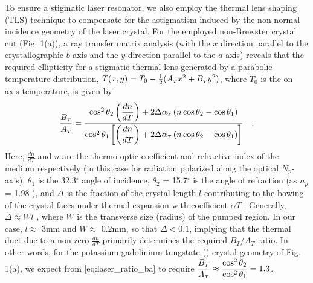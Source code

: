 To ensure a stigmatic laser resonator, we also employ the thermal lens shaping (TLS) technique\cite{Rimington_thermal_lens_2004} to compensate for the astigmatism induced by the non-normal incidence geometry of the laser crystal. 
For the employed non-Brewster crystal cut (Fig. 1(a)), a ray
transfer matrix analysis (with the $x$ direction parallel to the crystallographic $b$-axis and the $y$
direction parallel to the $a$-axis) reveals that the required ellipticity for a stigmatic thermal lens
generated by a parabolic temperature distribution, $T(x, y) = T_0 - \frac{1}{2} ( A_{{\scriptscriptstyle T}} x^2 + B_{{\scriptscriptstyle T}} y^2 )$, where $T_0$
is the on-axis temperature, is given by
\begin{equation} \label{eq:laser_ratio_ba}
  \frac{B_{{\scriptscriptstyle T}}}{A_{{\scriptscriptstyle T}}} = 
  \frac{ \cos^2 \theta_2 \left( \dfrac{dn}{dT} \right) + 2 \Delta \alpha_{{\scriptscriptstyle T}} \left( n \cos\theta_2 - \cos\theta_1 \right) }
       { \cos^2 \theta_1 \left[ \left( \dfrac{dn}{dT} \right) + 2 \Delta \alpha_{{\scriptscriptstyle T}} \left( n \cos\theta_2 - \cos\theta_1 \right) \right] }
  \quad\text{.}
\end{equation}
Here, $\frac{dn}{dT}$ and $n$ are the thermo-optic coefficient and refractive index of the medium respectively (in this case for radiation polarized along the optical $N_p$-axis), $\theta_1$ is the 32.3$^\circ$ angle of incidence, $\theta_2$ = 15.7$^\circ$ is the angle of refraction (as $n_p$ = 1.98 \cite{Biswal_thermo_optical_05,pujol_crystalline_1999}), and $\Delta$ is the fraction of the crystal length $l$ contributing to the bowing of the crystal faces under thermal
expansion with coefficient $\alpha T$ \cite{Rimington_thermal_lens_2004}.
Generally, $\Delta \approx W l$ , where $W$ is the transverse size (radius) of the pumped region\cite{Koechner_thermal_1970}.
In our case, $l \approx$ 3mm and $W \approx$ 0.2mm, so that $\Delta < 0.1$, implying that the thermal duct due to a non-zero $\frac{dn}{dT}$ primarily determines the required $B_T$/$A_T$ ratio.
In other words, for the potassium gadolinium tungstate () crystal geometry of Fig. 1(a), we expect from \ref{eq:laser_ratio_ba} to require $\dfrac{B_{{\scriptscriptstyle T}}}{A_{{\scriptscriptstyle T}}} \approx \dfrac{ \cos^2 \theta_2 }{ \cos^2 \theta_1 } = 1.3$.

